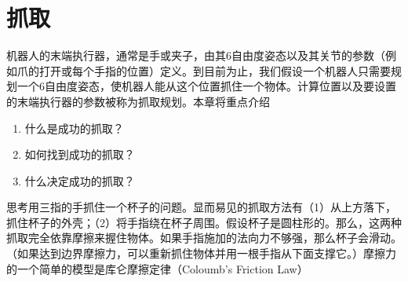 \chapter{抓取}


机器人的末端执行器，通常是手或夹子，由其6自由度姿态以及其关节的参数（例如爪的打开或每个手指的位置）定义。到目前为止，我们假设一个机器人只需要规划一个6自由度姿态，使机器人能从这个位置抓住一个物体。计算位置以及要设置的末端执行器的参数被称为抓取规划。本章将重点介绍

\begin{enumerate}

\item 什么是成功的抓取？
\item 如何找到成功的抓取？
\item 什么决定成功的抓取？
\end{enumerate}



思考用三指的手抓住一个杯子的问题。显而易见的抓取方法有（1）从上方落下，抓住杯子的外壳；（2）将手指绕在杯子周围。假设杯子是圆柱形的。那么，这两种抓取完全依靠摩擦来握住物体。如果手指施加的法向力不够强，那么杯子会滑动。（如果达到边界摩擦力，可以重新抓住物体并用一根手指从下面支撑它。）摩擦力的一个简单的模型是库仑摩擦定律（Coloumb's Friction Law）


